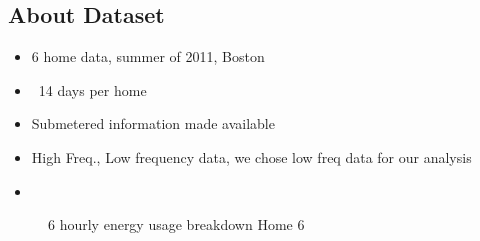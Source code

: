 \documentclass[conference]{IEEEtran}
\begin{document}
\subsection{About Dataset}
\begin{itemize}
\item 6 home data, summer of 2011, Boston
\item ~14 days per home
\item Submetered information made available
\item High Freq., Low frequency data, we chose low freq data for our analysis
\item 
\end{itemize}
\begin{figure} 
	
  	\caption{6 hourly energy usage breakdown Home 6}
    \label{fig:breakdown}
\end{figure}
\end{document}
